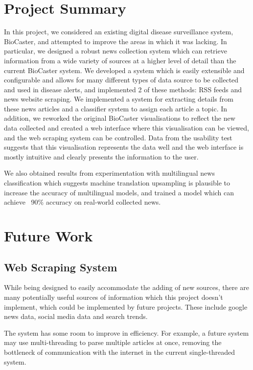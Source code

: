 \documentclass{l4proj}
\begin{document}
\section{Project Summary}
In this project, we considered an existing digital disease surveillance system, BioCaster, and attempted to improve the areas in which it was lacking. In particular, we designed a robust news collection system which can retrieve information from a wide variety of sources at a higher level of detail than the current BioCaster system. We developed a system which is easily extensible and configurable and allows for many different types of data source to be collected and used in disease alerts, and implemented 2 of these methods: RSS feeds and news website scraping. We implemented a system for extracting details from these news articles and a classifier system to assign each article a topic. In addition, we reworked the original BioCaster visualisations to reflect the new data collected and created a web interface where this visualisation can be viewed, and the web scraping system can be controlled. Data from the usability test suggests that this visualisation represents the data well and the web interface is mostly intuitive and clearly presents the information to the user. \par

We also obtained results from experimentation with multilingual news classification which suggests machine translation upsampling is plausible to increase the accuracy of multilingual models, and trained a model which can achieve ~90\% accuracy on real-world collected news. 

\section{Future Work}
\subsection{Web Scraping System}
While being designed to easily accommodate the adding of new sources, there are many potentially useful sources of information which this project doesn't implement, which could be implemented by future projects. These include google news data, social media data and search trends. \par
The system has some room to improve in efficiency. For example, a future system may use multi-threading to parse multiple articles at once, removing the bottleneck of communication with the internet in the current single-threaded system. 
\end{document}
